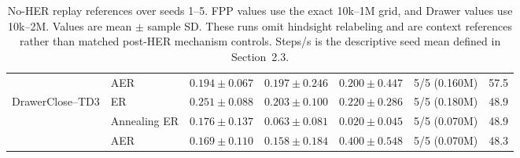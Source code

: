 \begin{table}[t]
\begin{tabular}{llccccc}
 & AER & \(0.194\pm0.067\) & \(0.197\pm0.246\) &
\(0.200\pm0.447\) & 5/5 (0.160M) & 57.5 \\
\addlinespace[2pt]
DrawerClose--TD3 & ER & \(0.251\pm0.088\) & \(0.203\pm0.100\) &
\(0.220\pm0.286\) & 5/5 (0.180M) & 48.9 \\
 & Annealing ER & \(0.176\pm0.137\) & \(0.063\pm0.081\) &
\(0.020\pm0.045\) & 5/5 (0.070M) & 48.9 \\
 & AER & \(0.169\pm0.110\) & \(0.158\pm0.184\) &
\(0.400\pm0.548\) & 5/5 (0.070M) & 48.3 \\
\bottomrule
\end{tabular}
\caption{No-HER replay references over seeds 1--5. FPP values use the exact
10k--1M grid, and Drawer values use 10k--2M. Values are mean $\pm$ sample SD.
These runs omit hindsight relabeling and are context references rather than
matched post-HER mechanism controls. Steps/s is the descriptive seed mean
defined in Section~2.3.}
\label{tab:supp-aer-noher}
\end{table}
